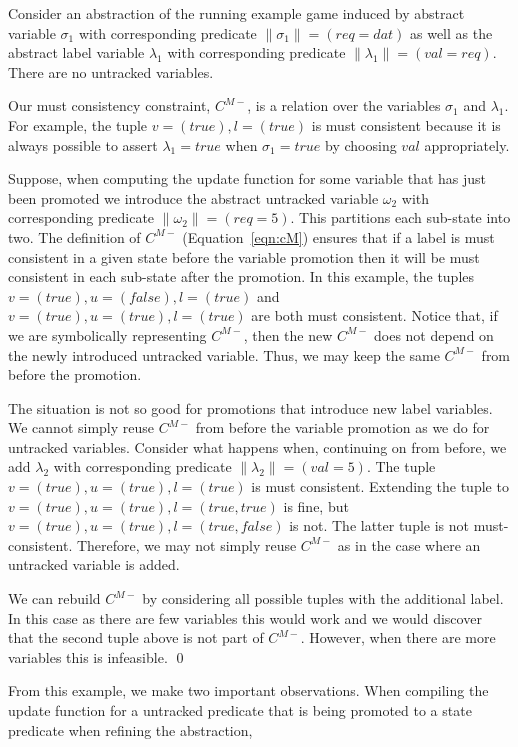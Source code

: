 \begin{ex}
    Consider an abstraction of the running example game induced by abstract variable $\sigma_1$ with corresponding predicate $\|\sigma_1\| = (req=dat)$ as well as the abstract label variable $\lambda_1$ with corresponding predicate $\|\lambda_1\| = (val=req)$. There are no untracked variables.

    Our must consistency constraint, $C^{M-}$, is a relation over the variables $\sigma_1$ and $\lambda_1$. For example, the tuple $v=(true), l=(true)$ is must consistent because it is always possible to assert $\lambda_1=true$ when $\sigma_1=true$ by choosing $val$ appropriately.

    Suppose, when computing the update function for some variable that has just been promoted we introduce the abstract untracked variable $\omega_2$ with corresponding predicate $\|\omega_2\| = (req=5)$. This partitions each sub-state into two. The definition of $C^{M-}$ (Equation~\ref{eqn:cM}) ensures that if a label is must consistent in a given state before the variable promotion then it will be must consistent in each sub-state after the promotion. In this example, the tuples $v=(true), u=(false), l=(true)$ and $v=(true), u=(true), l=(true)$ are both must consistent. Notice that, if we are symbolically representing $C^{M-}$, then the new $C^{M-}$ does not depend on the newly introduced untracked variable. Thus, we may keep the same $C^{M-}$ from before the promotion.

    The situation is not so good for promotions that introduce new label variables. We cannot simply reuse $C^{M-}$ from before the variable promotion as we do for untracked variables. Consider what happens when, continuing on from before, we add $\lambda_2$ with corresponding predicate $\|\lambda_2\| = (val=5)$. The tuple $v=(true), u=(true), l=(true)$ is must consistent. Extending the tuple to $v=(true), u=(true), l=(true, true)$ is fine, but $v=(true), u=(true), l=(true, false)$ is not. The latter tuple is not must-consistent. Therefore, we may not simply reuse $C^{M-}$ as in the case where an untracked variable is added. 

    We can rebuild $C^{M-}$ by considering all possible tuples with the additional label. In this case as there are few variables this would work and we would discover that the second tuple above is not part of $C^{M-}$. However, when there are more variables this is infeasible. 
    \qed
\end{ex}

From this example, we make two important observations. When compiling the update function for a untracked predicate that is being promoted to a state predicate when refining the abstraction, 

